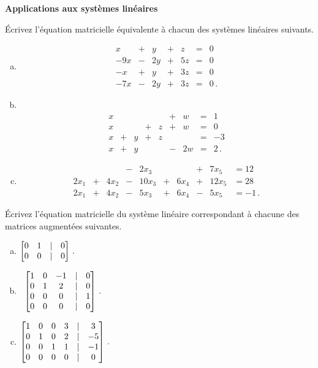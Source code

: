 \centerline{\bf  {Applications aux systèmes linéaires}} 
 \begin{prob} \label{prob14.5} \'Ecrivez l'équation matricielle équivalente à chacun des systèmes linéaires suivants.
\medskip
\begin{enumerate}[a)]
\item 
$$\begin{matrix} 
x&+&y&+&z&=&0\\
-9x&-&2y&+&5z&=&0\\
-x&+&y&+&3z&=&0\\
-7x&-&2y&+&3z&=&0\,. \end{matrix} $$
\medskip
 

\item\sov~$$\begin{matrix} x&&&&&+&w&=&1\\
x&&&+&z&+&w&=&0\\
x&+&y&+&z&&&=&-3\\
x&+&y&&&-&2w&=&2\,. \end{matrix} $$
\medskip
  
\item 
$$\begin{matrix} &&&-&2x_{3}&&&+&7x_{5}&=12\\
2x_{1}&+&4x_{2}&-&10x_{3}&+&6x_{4}&+&12x_{5}&=28\\
2x_{1}&+&4x_{2}&-&5x_{3}&+&6x_{4}&-&5x_{5}&=-1\,.\end{matrix}$$
\medskip
 
\end{enumerate}
 

\end{prob} \begin{prob} \label{prob14.6}  \'Ecrivez l'équation matricielle du système linéaire correspondant à chacune des matrices augmentées suivantes.
\medskip
\begin{enumerate}[a)]

\item $\bmatrix  0 & 1 &|& 0 \\
 0 & 0 &|& 0 \endbmatrix\,.$
\medskip
 
\item\sov~$ \bmatrix 1 & 0 & -1 &|&0 \\
 0 & 1 & 2 &|&0\\
 0 & 0 & 0&|&1 \\
 0 & 0 & 0 &|&0\endbmatrix\,.$
\medskip
 
\item $\bmatrix  1 & 0 & 0 & 3 &|& 3 \\
 0 & 1 & 0 & 2 &|& -5 \\
 0 & 0 & 1 & 1 &|& -1 \\
 0 & 0 & 0 & 0 &|& 0\endbmatrix\,.$
\medskip
 

\end{enumerate}
\end{prob}
